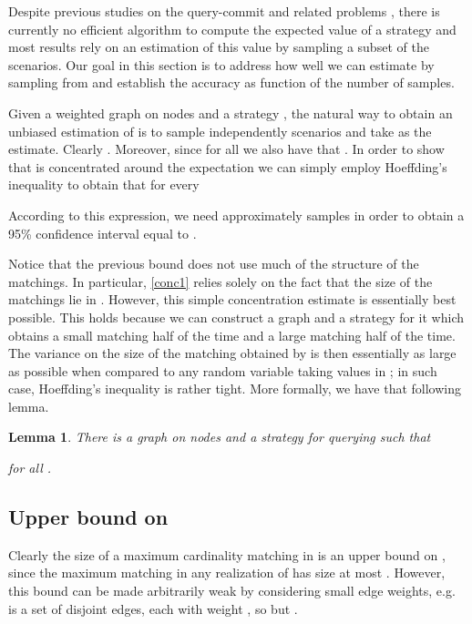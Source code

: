 \documentclass[12pt]{article}
\newtheorem{lemma}{Lemma}
\begin{document}
		 Despite previous studies on the query-commit and related problems \cite{chen,goemansKnapsack, goemansIP}, there is currently no efficient algorithm to compute the expected value of a strategy and most results rely on an estimation of this value by sampling a subset of the scenarios. Our goal in this section is to address how well we can estimate  by sampling from  and establish the accuracy as function of the number of samples. 

		Given a weighted graph  on  nodes and a strategy , the natural way to obtain an unbiased estimation of  is to sample independently  scenarios  and take  as the estimate. Clearly . Moreover, since  for all  we also have that . In order to show that  is concentrated around the expectation we can simply employ Hoeffding's inequality to obtain that for every 

	According to this expression, we need approximately  samples in order to obtain a 95\% confidence interval equal to . 
	
	Notice that the previous bound does not use much of the structure of the matchings. In particular, \eqref{conc1} relies solely on the fact that the size of the matchings lie in . However, this simple concentration estimate is essentially best possible. This holds because we can construct a graph and a strategy  for it which obtains a small matching half of the time and a large matching half of the time. The variance on the size of the matching obtained by  is then essentially as large as possible when compared to any random variable taking values in ; in such case, Hoeffding's inequality is rather tight. More formally, we have that following lemma.
	
	\begin{lemma} \label{tightSampling}
		There is a graph  on  nodes and a strategy  for querying  such that

		for all .
	\end{lemma}
			
	\subsection{Upper bound on } \label{secUB}
		
		Clearly the size of a maximum cardinality matching in  is an upper bound on , since the maximum matching in any realization of  has size at most .
However, this bound can be made arbitrarily weak by considering small edge weights, e.g.  is a set of disjoint edges, each with weight , so  but . 
		
\end{document}

